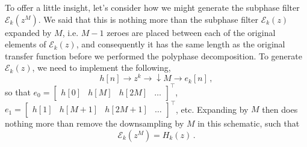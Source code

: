 To offer a little insight, let's consider how we might generate the subphase filter
$\mathscr{E}_k\left(z^M\right)$. We said that this is nothing more than the subphase
filter $\mathscr{E}_k\left(z\right)$ expanded by $M$, i.e. $M-1$ zeroes are placed
between each of the original elements of $\mathscr{E}_k\left(z\right)$, and consequently
it has the same length as the original transfer function before we performed the
polyphase decomposition. To generate $\mathscr{E}_k\left(z\right)$, we need to
implement the following,
%
\begin{displaymath}
  h[n] \longrightarrow \boxed{z^k}
  \longrightarrow \boxed{\downarrow M}
  \longrightarrow e_k[n] \,,
\end{displaymath}
%
so that
$e_0 = \left[\begin{array}{cccc}h[0] & h[M] & h[2M] & \hdots \end{array}\right]^\top$,
$e_1 = \left[\begin{array}{cccc}h[1] & h[M+1] & h[2M+1] & \hdots \end{array}\right]^\top$,
etc. Expanding by $M$ then does nothing more than remove the downsampling by $M$ in
this schematic, such that
%
\begin{displaymath}
  \mathscr{E}_k\left(z^M\right) = H_k(z) \,.
\end{displaymath}

